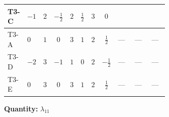 \documentclass[8pt]{article}
\begin{document}
\begin{landscape}
\begin{longtable}{@{}llcccccc >{\raggedright\arraybackslash}p{0.21\linewidth} >{\raggedright\arraybackslash}p{0.21\linewidth} >{\raggedright\arraybackslash}p{0.21\linewidth}@{}}
\midrule
T3-C & $-1$ & $2$ & $-\frac{1}{2}$ & $2$ & $\frac{1}{2}$ & $3$ & $0$ & \scriptsize\adjustbox{max width=\linewidth}{$\begin{gathered} -9 {g_2}^2 {\lambda_{11}}\end{gathered}$} & \scriptsize\adjustbox{max width=\linewidth}{$\begin{gathered} -3 {g_1}^2 {\lambda_{11}}\end{gathered}$} & \scriptsize\adjustbox{max width=\linewidth}{$\begin{gathered} +2 {\lambda_{HS_1}^{(1)}} {\lambda_{H H^\dagger S_1^\dagger S_2^\dagger}^{\rm Cross}}\end{gathered}$} \\
\midrule
T3-A & $0$ & $1$ & $0$ & $3$ & $1$ & $2$ & $\frac{1}{2}$ & --- & --- & --- \\
\midrule
T3-D & $-2$ & $3$ & $-1$ & $1$ & $0$ & $2$ & $-\frac{1}{2}$ & --- & --- & --- \\
\midrule
T3-E & $0$ & $3$ & $0$ & $3$ & $1$ & $2$ & $\frac{1}{2}$ & --- & --- & --- \\
\midrule
\bottomrule
\end{longtable}
\clearpage
\noindent\textbf{Quantity: }$\lambda_{11}$\par\smallskip

\end{landscape}
\end{document}
